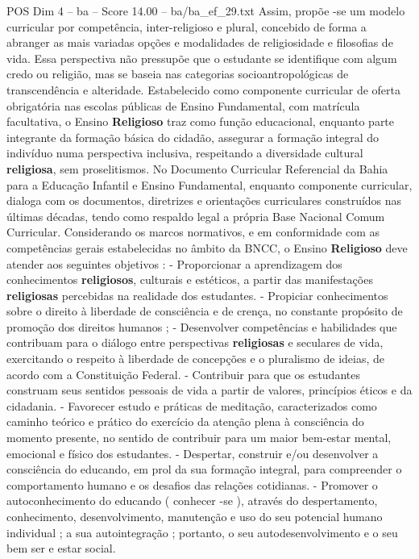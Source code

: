 \begin{textsample}{POS Dim 4 – ba – Score 14.00 – ba/ba\_ef\_29.txt}
Assim, propõe -se um modelo curricular por competência, inter-religioso e plural, concebido de forma a abranger as mais variadas opções e modalidades de religiosidade e filosofias de vida.
Essa perspectiva não pressupõe que o estudante se identifique com algum credo ou religião, mas se baseia nas categorias socioantropológicas de transcendência e alteridade.
Estabelecido como componente curricular de oferta obrigatória nas escolas públicas de Ensino Fundamental, com matrícula facultativa, o Ensino \textbf{Religioso} traz como função educacional, enquanto parte integrante da formação básica do cidadão, assegurar a formação integral do indivíduo numa perspectiva inclusiva, respeitando a diversidade cultural \textbf{religiosa}, sem proselitismos.
No Documento Curricular Referencial da Bahia para a Educação Infantil e Ensino Fundamental, enquanto componente curricular, dialoga com os documentos, diretrizes e orientações curriculares construídos nas últimas décadas, tendo como respaldo legal a própria Base Nacional Comum Curricular.
Considerando os marcos normativos, e em conformidade com as competências gerais estabelecidas no âmbito da BNCC, o Ensino \textbf{Religioso} deve atender aos seguintes objetivos : - Proporcionar a aprendizagem dos conhecimentos \textbf{religiosos}, culturais e estéticos, a partir das manifestações \textbf{religiosas} percebidas na realidade dos estudantes. - Propiciar conhecimentos sobre o direito à liberdade de consciência e de crença, no constante propósito de promoção dos direitos humanos ; - Desenvolver competências e habilidades que contribuam para o diálogo entre perspectivas \textbf{religiosas} e seculares de vida, exercitando o respeito à liberdade de concepções e o pluralismo de ideias, de acordo com a Constituição Federal. - Contribuir para que os estudantes construam seus sentidos pessoais de vida a partir de valores, princípios éticos e da cidadania. - Favorecer estudo e práticas de meditação, caracterizados como caminho teórico e prático do exercício da atenção plena à consciência do momento presente, no sentido de contribuir para um maior bem-estar mental, emocional e físico dos estudantes. - Despertar, construir e/ou desenvolver a consciência do educando, em prol da sua formação integral, para compreender o comportamento humano e os desafios das relações cotidianas. - Promover o autoconhecimento do educando ( conhecer -se ), através do despertamento, conhecimento, desenvolvimento, manutenção e uso do seu potencial humano individual ; a sua autointegração ; portanto, o seu autodesenvolvimento e o seu bem ser e estar social.

\end{textsample}
